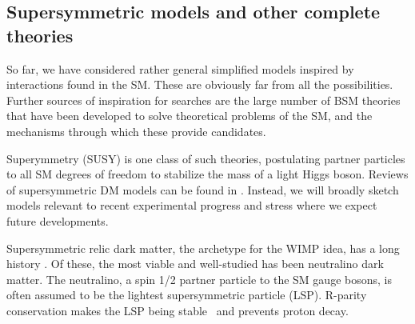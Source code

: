 
\subsection{Supersymmetric models and other complete theories}
\label{sec:SUSYModels}

So far, we have considered rather general simplified models inspired by interactions found in the SM. These are obviously far from all the possibilities. %
 Further sources of inspiration for searches are the large number of BSM theories that have been developed to solve theoretical problems of the SM, and the mechanisms through which these provide \IP candidates. 

Superymmetry (SUSY) is one class of such theories, postulating partner particles to all SM degrees of freedom to stabilize
the mass of a light Higgs boson.  
Reviews of supersymmetric DM models can be found in \cite{Feng:2010gw,Ellis:2010kf}.
Instead, we will broadly sketch models relevant to
recent experimental progress and stress where we expect future developments. 

Supersymmetric relic dark matter, the archetype for the WIMP idea, has a long
history \cite{doi:10.1016/0550-3213(84)90461-9}. Of these, the most viable and well-studied has been neutralino dark matter. 
The neutralino, a spin 1/2 partner particle to the SM gauge bosons, is often assumed to be the lightest supersymmetric particle (LSP). 
R-parity conservation makes the LSP being stable~\cite{Farrar:1978xj} and prevents proton decay. 

